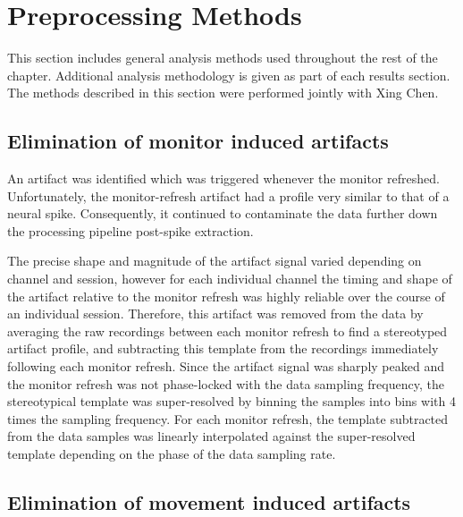 \FloatBarrier
\section{Preprocessing Methods}
\label{sec:pl_preprocessing}

This section includes general analysis methods used throughout the rest of the chapter.
Additional analysis methodology is given as part of each results section.
The methods described in this section were performed jointly with Xing Chen.


\subsection{Elimination of monitor induced artifacts}
\label{sec:pl_artifact_elimination}
\label{sec:ma}

An artifact was identified which was triggered whenever the monitor refreshed.
Unfortunately, the monitor-refresh artifact had a profile very similar to that of a neural spike.
Consequently, it continued to contaminate the data further down the processing pipeline post-spike extraction.

The precise shape and magnitude of the artifact signal varied depending on channel and session, however for each individual channel the timing and shape of the artifact relative to the monitor refresh was highly reliable over the course of an individual session.
Therefore, this artifact was removed from the data by averaging the raw recordings between each monitor refresh to find a stereotyped artifact profile, and subtracting this template from the recordings immediately following each monitor refresh.
Since the artifact signal was sharply peaked and the monitor refresh was not phase-locked with the data sampling frequency, the stereotypical template was super-resolved by binning the samples into bins with 4 times the sampling frequency.
For each monitor refresh, the template subtracted from the data samples was linearly interpolated against the super-resolved template depending on the phase of the data sampling rate.


\subsection{Elimination of movement induced artifacts}
\label{sec:pl_movement_artifact}

